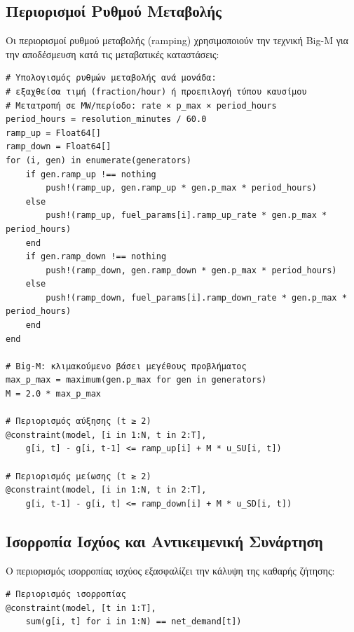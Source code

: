 \subsection{Περιορισμοί Ρυθμού Μεταβολής}
\label{subsec:impl-uc-ramping}

Οι περιορισμοί ρυθμού μεταβολής (ramping) χρησιμοποιούν την τεχνική Big-M για την αποδέσμευση κατά τις μεταβατικές καταστάσεις:

\begin{samepage}
\begin{verbatim}
# Υπολογισμός ρυθμών μεταβολής ανά μονάδα:
# εξαχθείσα τιμή (fraction/hour) ή προεπιλογή τύπου καυσίμου
# Μετατροπή σε MW/περίοδο: rate × p_max × period_hours
period_hours = resolution_minutes / 60.0
ramp_up = Float64[]
ramp_down = Float64[]
for (i, gen) in enumerate(generators)
    if gen.ramp_up !== nothing
        push!(ramp_up, gen.ramp_up * gen.p_max * period_hours)
    else
        push!(ramp_up, fuel_params[i].ramp_up_rate * gen.p_max * period_hours)
    end
    if gen.ramp_down !== nothing
        push!(ramp_down, gen.ramp_down * gen.p_max * period_hours)
    else
        push!(ramp_down, fuel_params[i].ramp_down_rate * gen.p_max * period_hours)
    end
end

# Big-M: κλιμακούμενο βάσει μεγέθους προβλήματος
max_p_max = maximum(gen.p_max for gen in generators)
M = 2.0 * max_p_max

# Περιορισμός αύξησης (t ≥ 2)
@constraint(model, [i in 1:N, t in 2:T],
    g[i, t] - g[i, t-1] <= ramp_up[i] + M * u_SU[i, t])

# Περιορισμός μείωσης (t ≥ 2)
@constraint(model, [i in 1:N, t in 2:T],
    g[i, t-1] - g[i, t] <= ramp_down[i] + M * u_SD[i, t])
\end{verbatim}
\end{samepage}

\subsection{Ισορροπία Ισχύος και Αντικειμενική Συνάρτηση}
\label{subsec:uc-balance-objective}

Ο περιορισμός ισορροπίας ισχύος εξασφαλίζει την κάλυψη της καθαρής ζήτησης:

\begin{samepage}
\begin{verbatim}
# Περιορισμός ισορροπίας
@constraint(model, [t in 1:T],
    sum(g[i, t] for i in 1:N) == net_demand[t])
\end{verbatim}
\end{samepage}

